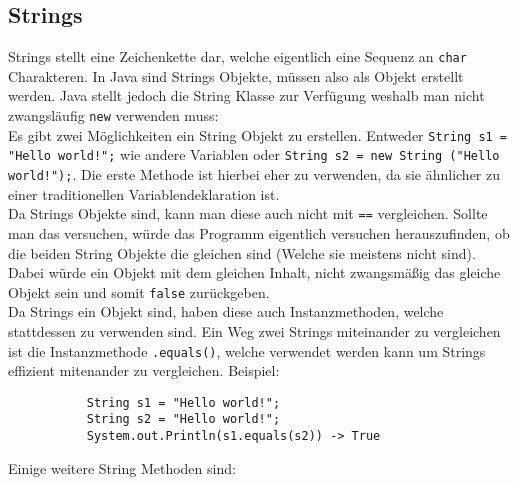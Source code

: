 \documentclass{article}
\begin{document}
	\subsection{Strings}
	Strings stellt eine Zeichenkette dar, welche eigentlich eine Sequenz an \verb|char| Charakteren. In Java sind Strings Objekte, müssen also als Objekt erstellt werden. Java stellt jedoch die String Klasse zur Verfügung weshalb man nicht zwangsläufig \verb|new| verwenden muss: \\
	Es gibt zwei Möglichkeiten ein String Objekt zu erstellen. Entweder \verb|String s1 = "Hello world!";| wie andere Variablen oder \verb|String s2 = new String ("Hello world!");|. Die erste Methode ist hierbei eher zu verwenden, da sie ähnlicher zu einer traditionellen Variablendeklaration ist. \\
	Da Strings Objekte sind, kann man diese auch nicht mit \verb|==| vergleichen. Sollte man das versuchen, würde das Programm eigentlich versuchen herauszufinden, ob die beiden String Objekte die gleichen sind (Welche sie meistens nicht sind). Dabei würde ein Objekt mit dem gleichen Inhalt, nicht zwangsmäßig das gleiche Objekt sein und somit \verb|false| zurückgeben. \\
	Da Strings ein Objekt sind, haben diese auch Instanzmethoden, welche stattdessen zu verwenden sind. Ein Weg zwei Strings miteinander zu vergleichen ist die Instanzmethode \verb|.equals()|, welche verwendet werden kann um Strings effizient mitenander zu vergleichen. Beispiel:
	\begin{verbatim}
	       String s1 = "Hello world!";
	       String s2 = "Hello world!";
	       System.out.Println(s1.equals(s2)) -> True
	\end{verbatim}
	Einige weitere String Methoden sind:
\end{document}
